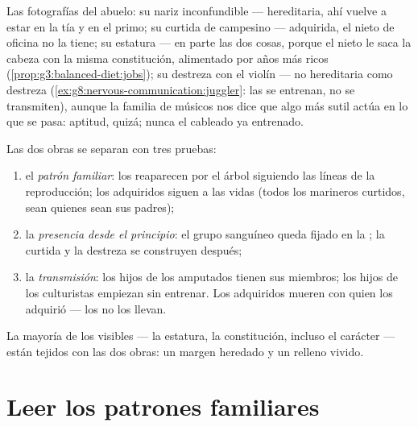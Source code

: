 \begin{example}\label{ex:g9:heredity-and-traits:album}
Las fotografías del abuelo: su nariz inconfundible --- hereditaria, ahí
vuelve a estar en la tía y en el primo; su  curtida de campesino
--- adquirida, el nieto de oficina no la tiene; su estatura ---
en parte las dos cosas, porque el nieto le saca la cabeza con la misma
constitución, alimentado por años más ricos
(\cref{prop:g3:balanced-diet:jobs}); su destreza con el violín --- no
hereditaria como destreza (\cref{ex:g8:nervous-communication:juggler}:
las  se entrenan, no se transmiten), aunque la familia de
músicos nos dice que algo más sutil actúa en lo que se pasa: aptitud,
quizá; nunca el cableado ya entrenado.
\end{example}

\begin{proposition}\label{prop:g9:heredity-and-traits:sorting}
Las dos obras se separan con tres pruebas:
\begin{enumerate}
  \item el \emph{patrón familiar}: los  reaparecen
        por el árbol siguiendo las líneas de la reproducción; los
        adquiridos siguen a las vidas (todos los marineros curtidos,
        sean quienes sean sus padres);
  \item la \emph{presencia desde el principio}: el grupo sanguíneo
        queda fijado en la ; la  curtida y la destreza
        se construyen después;
  \item la \emph{transmisión}: los hijos de los amputados tienen sus
        miembros; los hijos de los culturistas empiezan sin entrenar.
        Los  adquiridos mueren con quien los adquirió --- los
         no los llevan.
\end{enumerate}
La mayoría de los  visibles --- la estatura, la constitución,
incluso el carácter --- están tejidos con las dos obras: un margen
heredado y un relleno vivido.
\end{proposition}
\admitted

\section{Leer los patrones familiares}

